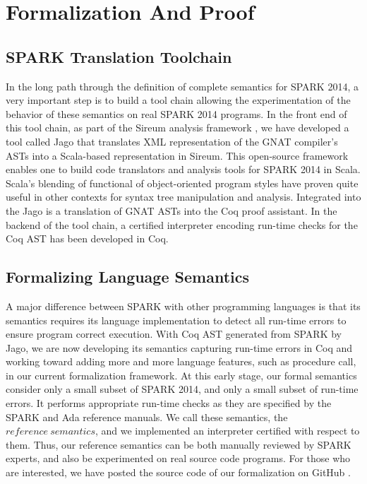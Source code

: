\section{Formalization And Proof}

\subsection{SPARK Translation Toolchain}
In the long path through the definition of complete semantics for
SPARK 2014, a very important step is to build a tool chain allowing 
the experimentation of the behavior of these semantics on real SPARK
2014 programs. In the front end of this tool chain, as part of the 
Sireum analysis framework \cite{Sireum:URL}, we have developed a tool called Jago
\cite{Jago:URL} that translates XML representation of the GNAT compiler's 
ASTs into a Scala-based 
representation in Sireum.  This open-source framework enables one to build
code translators and analysis tools for SPARK 2014 in Scala.  Scala's 
blending of functional of object-oriented program styles have proven 
quite useful in other contexts for syntax tree manipulation and analysis.  
Integrated into the Jago is a translation of GNAT ASTs into the Coq proof 
assistant. In the backend of the tool chain, a certified interpreter 
encoding run-time checks for the Coq AST has been developed in Coq.

\subsection{Formalizing Language Semantics}
A major difference between SPARK with other programming languages is that 
its semantics requires its language implementation to detect all run-time errors to 
ensure program correct execution. With Coq AST generated from SPARK by Jago, we 
are now developing its semantics capturing run-time errors in Coq and working toward 
adding more and more language features, such as procedure call, in our current 
formalization framework.
At this early stage, our formal semantics consider only a small subset
of SPARK 2014, and only a small subset of run-time errors.  It performs 
appropriate run-time checks as they are specified by the SPARK and Ada 
reference manuals.  We call these semantics, the $\mathit{reference\
semantics}$, and we implemented an interpreter certified with respect to them.
Thus, our reference semantics can be both manually reviewed by SPARK 
experts, and also be experimented on real source code programs.
For those who are interested, we have posted the source code of our
formalization on GitHub \cite{Formalization:URL}.


